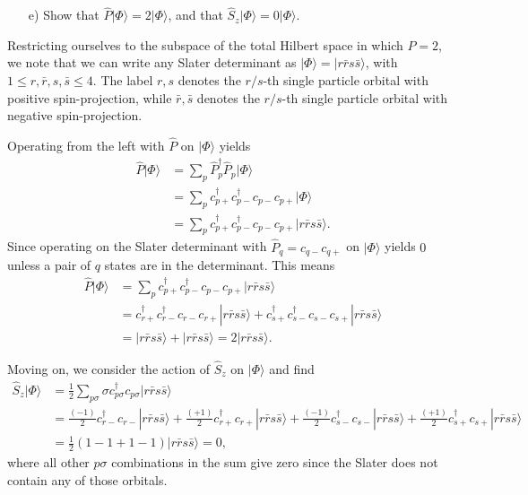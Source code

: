 \documentclass[a4paper]{article}
\newcommand{\nn}{\nonumber}
\newcommand{\ps}{{p\sigma}}
\newcommand{\cpp}{c_{p+}}
\newcommand{\cppd}{c_{p+}^\dagger}
\newcommand{\cpm}{c_{p-}}
\newcommand{\cpmd}{c_{p-}^\dagger}
\newcommand{\cqp}{c_{q+}}
\newcommand{\cqm}{c_{q-}}
\newcommand{\crp}{c_{r+}}
\newcommand{\crpd}{c_{r+}^\dagger}
\newcommand{\crm}{c_{r-}}
\newcommand{\crmd}{c_{r-}^\dagger}
\begin{document}
\begin{exframe}
\begin{itemize}
  \item[e)] Show that $\hat P|\Phi\rangle=2|\Phi\rangle$, and that $\hat S_z|\Phi\rangle = 0 |\Phi\rangle$.
\end{itemize}
\end{exframe}
Restricting ourselves to the subspace of the total Hilbert space in which $P=2$, we note that we can write any Slater determinant as $|\Phi\rangle = |r\bar r s\bar s\rangle$, with $1 \le r,\bar r, s, \bar s \le 4$. The label $r,s$ denotes the $r/s$-th single particle orbital with positive spin-projection, while $\bar r, \bar s$ denotes the $r/s$-th single particle orbital with negative spin-projection.

Operating from the left with $\hat P$ on $|\Phi\rangle$ yields 
\begin{align}
\hat P |\Phi\rangle &= \sum_{p} \hat P_p^\dagger \hat P_p |\Phi\rangle \nn\\
%
&= \sum_{p} \cppd\cpmd \cpm \cpp |\Phi\rangle \nn\\ 
%
&= \sum_{p} \cppd\cpmd \cpm \cpp |r\bar r s \bar s\rangle.
\end{align}
Since operating on the Slater determinant with $\hat P_q=\cqm\cqp$ on $|\Phi\rangle$ yields $0$ unless a pair of $q$ states are in the determinant. This means 
\begin{align}
\hat P |\Phi\rangle &= \sum_{p} \cppd\cpmd \cpm \cpp |r\bar r s \bar s\rangle \nn\\
%
&= \crpd\crmd \crm \crp |r\bar r s \bar s\rangle + c_{s+}^\dagger c_{s-}^\dagger c_{s-} c_{s+} |r\bar r s \bar s\rangle \nn\\
%
&= |r\bar r s \bar s\rangle + |r\bar r s \bar s\rangle = 2|r\bar r s \bar s\rangle.
\end{align}

Moving on, we consider the action of $\hat S_z$ on $|\Phi\rangle$ and find
\begin{align}
\hat S_z |\Phi\rangle &= \frac{1}{2}\sum_\ps \sigma c_{p\sigma}^\dagger c_{p\sigma} |r\bar r s \bar s\rangle \nn\\
%
&= \frac{(-1)}{2} c_{r-}^\dagger c_{r-} |r\bar r s \bar s\rangle + \frac{(+1)}{2} c_{r+}^\dagger c_{r+} |r\bar r s \bar s\rangle + \frac{(-1)}{2} c_{s-}^\dagger c_{s-} |r\bar r s \bar s\rangle + \frac{(+1)}{2} c_{s+}^\dagger c_{s+} |r\bar r s \bar s\rangle \nn\\
&= \frac{1}{2}\left(1-1+1-1\right)  |r\bar r s \bar s\rangle = 0,
\end{align}
where all other $\ps$ combinations in the sum give zero since the Slater does not contain any of those orbitals. 
\end{document}

